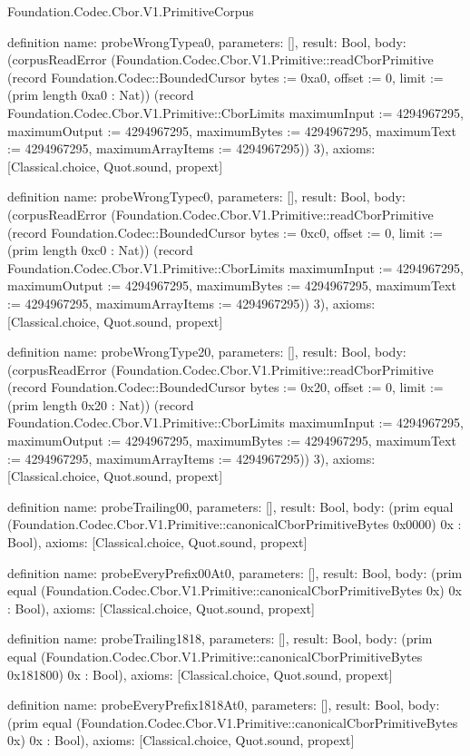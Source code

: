 \begin{lexlean}{Foundation.Codec.Cbor.V1.PrimitiveCorpus}
\begin{semanticmodule}
definition{
  name: probeWrongTypea0,
  parameters: [],
  result: Bool,
  body: (corpusReadError (Foundation.Codec.Cbor.V1.Primitive::readCborPrimitive (record Foundation.Codec::BoundedCursor {bytes := 0xa0, offset := 0, limit := (prim length 0xa0 : Nat)}) (record Foundation.Codec.Cbor.V1.Primitive::CborLimits {maximumInput := 4294967295, maximumOutput := 4294967295, maximumBytes := 4294967295, maximumText := 4294967295, maximumArrayItems := 4294967295})) 3),
  axioms: [Classical.choice, Quot.sound, propext]
}

definition{
  name: probeWrongTypec0,
  parameters: [],
  result: Bool,
  body: (corpusReadError (Foundation.Codec.Cbor.V1.Primitive::readCborPrimitive (record Foundation.Codec::BoundedCursor {bytes := 0xc0, offset := 0, limit := (prim length 0xc0 : Nat)}) (record Foundation.Codec.Cbor.V1.Primitive::CborLimits {maximumInput := 4294967295, maximumOutput := 4294967295, maximumBytes := 4294967295, maximumText := 4294967295, maximumArrayItems := 4294967295})) 3),
  axioms: [Classical.choice, Quot.sound, propext]
}

definition{
  name: probeWrongType20,
  parameters: [],
  result: Bool,
  body: (corpusReadError (Foundation.Codec.Cbor.V1.Primitive::readCborPrimitive (record Foundation.Codec::BoundedCursor {bytes := 0x20, offset := 0, limit := (prim length 0x20 : Nat)}) (record Foundation.Codec.Cbor.V1.Primitive::CborLimits {maximumInput := 4294967295, maximumOutput := 4294967295, maximumBytes := 4294967295, maximumText := 4294967295, maximumArrayItems := 4294967295})) 3),
  axioms: [Classical.choice, Quot.sound, propext]
}

definition{
  name: probeTrailing00,
  parameters: [],
  result: Bool,
  body: (prim equal (Foundation.Codec.Cbor.V1.Primitive::canonicalCborPrimitiveBytes 0x0000) 0x : Bool),
  axioms: [Classical.choice, Quot.sound, propext]
}

definition{
  name: probeEveryPrefix00At0,
  parameters: [],
  result: Bool,
  body: (prim equal (Foundation.Codec.Cbor.V1.Primitive::canonicalCborPrimitiveBytes 0x) 0x : Bool),
  axioms: [Classical.choice, Quot.sound, propext]
}

definition{
  name: probeTrailing1818,
  parameters: [],
  result: Bool,
  body: (prim equal (Foundation.Codec.Cbor.V1.Primitive::canonicalCborPrimitiveBytes 0x181800) 0x : Bool),
  axioms: [Classical.choice, Quot.sound, propext]
}

definition{
  name: probeEveryPrefix1818At0,
  parameters: [],
  result: Bool,
  body: (prim equal (Foundation.Codec.Cbor.V1.Primitive::canonicalCborPrimitiveBytes 0x) 0x : Bool),
  axioms: [Classical.choice, Quot.sound, propext]
}


\end{semanticmodule}
\end{lexlean}
